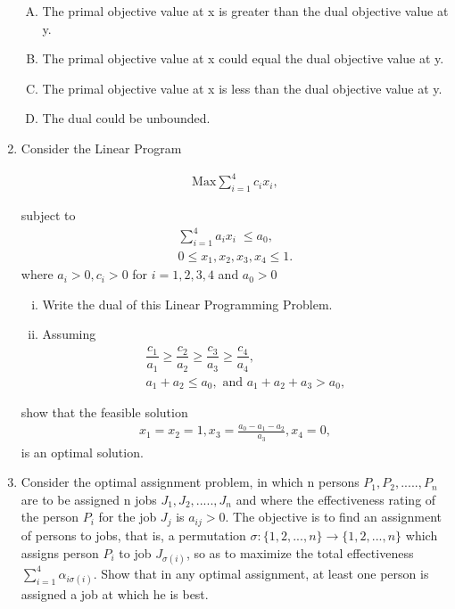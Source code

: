 \documentclass[journal,12pt,twocolumn]{IEEEtran}
\begin{document}
\begin{enumerate}
\begin{enumerate}[(A)]
\item The primal objective value at x is greater than the dual objective value at y.
\item The primal objective value at x could equal the dual objective value at y.
\item The primal objective value at x is less than the dual objective value at y.
\item The dual could be unbounded.

\end{enumerate}

\item Consider the Linear Program \\

\begin{center}
\begin{align*}
\text{Max} \! \sum_{i=1}^{4} c_ix_i ,
\end{align*}
\end{center}
subject to 
%
\begin{align*}
\sum_{i=1}^{4} a_ix_i \; \leqslant \! a_0, \\
0 \! \leqslant \! x_1, \! x_2, \! x_3, \! x_4 \! \leqslant \! 1.
\end{align*}
where $a_i \! > \! 0, \! c_i \! > \! 0$ for $i = 1,2,3,4$ and $a_0 \! > \! 0$ 
%
\begin{enumerate}[(i)]
\setlength\itemsep{1em}

\item Write the dual of this Linear Programming Problem.
\item Assuming 
\begin{align*}
\dfrac{c_1}{a_1} \! \geqslant \! \dfrac{c_2}{a_2} \! \geqslant \! \dfrac{c_3}{a_3} \! \geqslant \! \dfrac{c_4}{a_4}, \\
a_1 \! + \! a_2 \! \leqslant \! a_0, \text{ and } a_1 \! + \! a_2 \! + \! a_3 \! > \! a_0,
\end{align*}
\end{enumerate}
show that the feasible solution 
\begin{align*}
x_1=x_2=1, \! x_3=\frac{a_0-a_1-a_2}{a_3}, \! x_4=0,
\end{align*}
is an optimal solution.

\item Consider the optimal assignment problem, in which n persons $P_1,P_2,.....,P_n$ are to be assigned n jobs $J_1,J_2,.....,J_n$ and where the effectiveness rating of the person $P_i$ for the job $J_j$ is $a_{ij}>0$. The objective is to find an assignment of persons to jobs, that is, a permutation $\sigma : \{1,2,...,n\} \rightarrow \{1,2,...,n\}$ which assigns person $P_i$ to job $J_{\sigma (i)}$, so as to maximize the total effectiveness $\sum_{i=1}^4 \alpha_{i \sigma (i)}$. Show that in any optimal assignment, at least one person is assigned a job at which he is best.


\end{enumerate}
\end{document}

